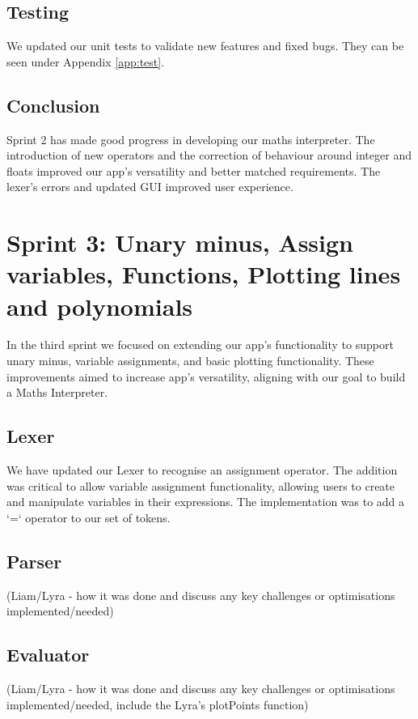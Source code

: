 \documentclass[a4paper, oneside, 11pt]{report}
\begin{document}
\subsection{Testing}
We updated our unit tests to validate new features and fixed bugs. They can be seen under Appendix \ref{app:test}.

\subsection{Conclusion}
Sprint 2 has made good progress in developing our maths interpreter. The introduction of new operators and the correction of behaviour around integer and floats improved our app's versatility and better matched requirements. The lexer's errors and updated GUI improved user experience.


\section{Sprint 3: Unary minus, Assign variables, Functions, Plotting lines and polynomials}
In the third sprint we focused on extending our app’s functionality to support unary minus, variable assignments, and basic plotting functionality. These improvements aimed to increase app’s versatility, aligning with our goal to build a Maths Interpreter.

\subsection{Lexer}
We have updated our Lexer to recognise an assignment operator. The addition was critical to allow variable assignment functionality, allowing users to create and manipulate variables in their expressions. The implementation was to add a ‘=‘ operator to our set of tokens.

\subsection{Parser}
(Liam/Lyra - how it was done and discuss any key challenges or optimisations implemented/needed)

\subsection{Evaluator}
(Liam/Lyra - how it was done and discuss any key challenges or optimisations implemented/needed, include the Lyra's plotPoints function)
\end{document}
